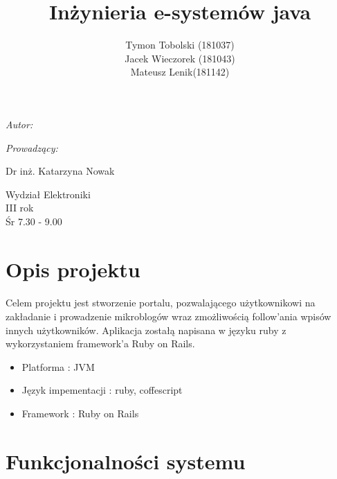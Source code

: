 \documentclass[wide,a4paper,titlepage,12pt] {article}
\title{Inżynieria e-systemów java}
\author{Tymon Tobolski (181037)\\ Jacek Wieczorek (181043) \\ Mateusz Lenik(181142)}
\makeatletter
\renewcommand{\maketitle}{
\begin{titlepage}
  \begin{center}
    \vspace*{3cm}
    \LARGE \@title \par
    \vspace{2cm}
    \textit{\small Autor:}\par
    \normalsize \@author\par \normalsize
    \vspace{3cm}
    \textit{\small Prowadzący:}\par
    Dr inż. Katarzyna Nowak \par
    \vspace{2cm}
    Wydział Elektroniki\\ III rok\\ Śr 7.30 - 9.00\par

  \end{center}
\end{titlepage}
}
\makeatother
\begin{document}
\maketitle
  \section{Opis projektu}
  \paragraph{}
  Celem projektu jest stworzenie portalu, pozwalającego użytkownikowi na zakładanie i prowadzenie mikroblogów wraz zmożliwością follow'ania wpisów innych użytkowników. Aplikacja zostałą napisana w języku ruby z wykorzystaniem framework'a Ruby on Rails.
  \begin{itemize}
    \item Platforma : JVM
    \item Język impementacji : ruby, coffescript
    \item Framework : Ruby on Rails 
  \end{itemize}
  \section{Funkcjonalności systemu}
\end{document}
